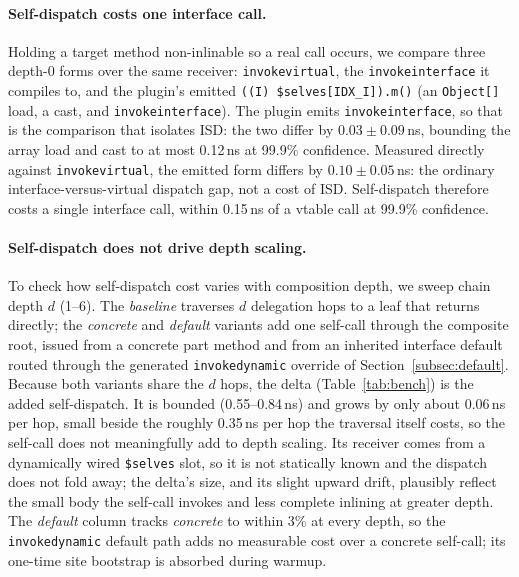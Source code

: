 \documentclass[acmsmall,screen,review,anonymous]{acmart}
\theoremstyle{acmplain}
\newcommand{\code}[1]{\texttt{#1}}
\begin{document}
\paragraph{Self-dispatch costs one interface call.}
Holding a target method non-inlinable so a real call occurs, we compare three
depth-0 forms over the same receiver: \code{invokevirtual}, the
\code{invokeinterface} it compiles to, and the plugin's emitted
\code{((I)\,\$selves[IDX\_I]).m()} (an \code{Object[]} load, a cast, and
\code{invokeinterface}). The plugin emits \code{invokeinterface}, so that is the
comparison that isolates ISD: the two differ by $0.03\pm0.09$\,ns, bounding the
array load and cast to at most 0.12\,ns at 99.9\% confidence.
Measured directly against \code{invokevirtual}, the emitted form differs by
$0.10\pm0.05$\,ns: the ordinary interface-versus-virtual dispatch gap, not a cost
of ISD. Self-dispatch therefore costs a single interface call, within 0.15\,ns of
a vtable call at 99.9\% confidence.

\paragraph{Self-dispatch does not drive depth scaling.}
To check how self-dispatch cost varies with composition depth, we sweep chain
depth $d$ (1--6). The \emph{baseline} traverses $d$ delegation hops to a leaf
that returns directly; the \emph{concrete} and \emph{default} variants add one
self-call through the composite root, issued from a concrete part method and from
an inherited interface default routed through the generated \code{invokedynamic}
override of Section~\ref{subsec:default}. Because both variants share the $d$
hops, the delta (Table~\ref{tab:bench}) is the added self-dispatch. It is bounded
(0.55--0.84\,ns) and grows by only about 0.06\,ns per hop, small beside the
roughly 0.35\,ns per hop the traversal itself costs, so the self-call does not
meaningfully add to depth scaling. Its receiver comes from a dynamically wired
\code{\$selves} slot, so it is not statically known and the dispatch does not
fold away; the delta's size, and its slight upward drift, plausibly reflect the
small body the self-call invokes and less complete inlining at greater depth. The
\emph{default} column tracks \emph{concrete} to within 3\% at every depth, so the
\code{invokedynamic} default path adds no measurable cost over a concrete
self-call; its one-time site bootstrap is absorbed during warmup.
\end{document}
